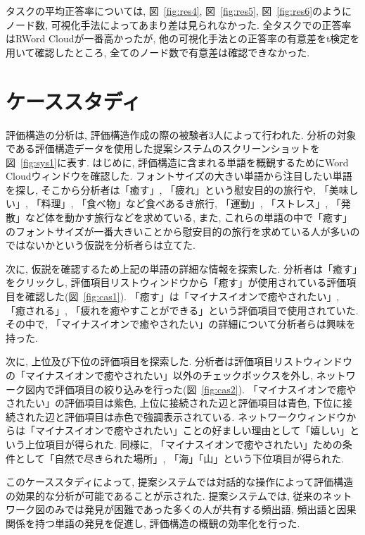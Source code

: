 \documentclass[syuuron]{kuee}
\begin{document}
	タスクの平均正答率については, 図~\ref{fig:res4}, 図~\ref{fig:res5}, 図~\ref{fig:res6}のようにノード数, 可視化手法によってあまり差は見られなかった. 
	全タスクでの正答率はRWord Cloudが一番高かったが, 
	他の可視化手法との正答率の有意差をt検定を用いて確認したところ, 全てのノード数で有意差は確認できなかった. 
		
	\section{ケーススタディ}
	評価構造の分析は, 評価構造作成の際の被験者3人によって行われた. 
	分析の対象である評価構造データを使用した提案システムのスクリーンショットを図~\ref{fig:sys1}に表す. 
	はじめに, 評価構造に含まれる単語を概観するためにWord Cloudウィンドウを確認した. 
	フォントサイズの大きい単語から注目したい単語を探し, そこから分析者は「癒す」, 「疲れ」という慰安目的の旅行や, 
	「美味しい」, 「料理」, 「食べ物」など食べあるき旅行, 「運動」, 「ストレス」, 「発散」など体を動かす旅行などを求めている, 
	また, これらの単語の中で「癒す」のフォントサイズが一番大きいことから慰安目的の旅行を求めている人が多いのではないかという仮説を分析者らは立てた. 
	
	次に, 仮説を確認するため上記の単語の詳細な情報を探索した. 
	分析者は「癒す」をクリックし, 評価項目リストウィンドウから「癒す」が使用されている評価項目を確認した(図~\ref{fig:cas1}). 
	「癒す」は「マイナスイオンで癒やされたい」, 「癒される」, 「疲れを癒やすことができる」という評価項目で使用されていた. 
	その中で, 「マイナスイオンで癒やされたい」の詳細について分析者らは興味を持った. 
	
	次に, 上位及び下位の評価項目を探索した. 
	分析者は評価項目リストウィンドウの「マイナスイオンで癒やされたい」以外のチェックボックスを外し, 
	ネットワーク図内で評価項目の絞り込みを行った(図~\ref{fig:cas2}). 
	「マイナスイオンで癒やされたい」の評価項目は紫色, 上位に接続された辺と評価項目は青色, 
	下位に接続された辺と評価項目は赤色で強調表示されている. 
	ネットワークウィンドウからは「マイナスイオンで癒やされたい」ことの好ましい理由として「嬉しい」という上位項目が得られた. 
	同様に, 「マイナスイオンで癒やされたい」ための条件として「自然で尽きられた場所」, 「海」「山」という下位項目が得られた. 
	
	このケーススタディによって, 提案システムでは対話的な操作によって評価構造の効果的な分析が可能であることが示された. 
	提案システムでは, 従来のネットワーク図のみでは発見が困難であった多くの人が共有する頻出語, 頻出語と因果関係を持つ単語の発見を促進し, 
	評価構造の概観の効率化を行った. 
	
\end{document}
